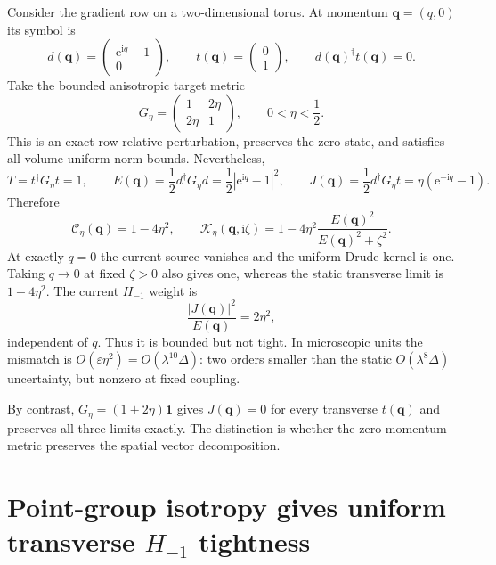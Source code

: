 \documentclass[11pt]{article}
\theoremstyle{definition}
\theoremstyle{remark}
\newcommand{\cK}{\mathcal K}
\newcommand{\cC}{\mathcal C}
\newcommand{\Id}{\mathbf 1}
\newcommand{\I}{\mathrm i}
\newcommand{\e}{\mathrm e}
\newcommand{\abs}[1]{\left\lvert #1\right\rvert}
\newcommand{\eps}{\varepsilon}
\newcommand{\bq}{\bm q}
\begin{document}
Consider the gradient row on a two-dimensional torus.  At momentum
$\bq=(q,0)$ its symbol is
\begin{equation}
 d(\bq)=\begin{pmatrix}\e^{\I q}-1\\0\end{pmatrix},
 \qquad
 t(\bq)=\begin{pmatrix}0\\1\end{pmatrix},
 \qquad d(\bq)^\dagger t(\bq)=0.
 \label{eq:edge-symbol}
\end{equation}
Take the bounded anisotropic target metric
\begin{equation}
 G_\eta=\begin{pmatrix}1&2\eta\\2\eta&1\end{pmatrix},
 \qquad 0<\eta<\frac12.
 \label{eq:anisotropic-G}
\end{equation}
This is an exact row-relative perturbation, preserves the zero state, and
satisfies all volume-uniform norm bounds.  Nevertheless,
\begin{equation}
 T=t^\dagger G_\eta t=1,
 \qquad
 E(\bq)=\frac12d^\dagger G_\eta d=\frac12\abs{\e^{\I q}-1}^2,
 \qquad
 J(\bq)=\frac12d^\dagger G_\eta t=\eta(\e^{-\I q}-1).
 \label{eq:aniso-data}
\end{equation}
Therefore
\begin{equation}
 \cC_\eta(\bq)=1-4\eta^2,
 \qquad
 \cK_\eta(\bq,\I\zeta)
 =1-4\eta^2\frac{E(\bq)^2}{E(\bq)^2+\zeta^2}.
 \label{eq:aniso-kernel}
\end{equation}
At exactly $q=0$ the current source vanishes and the uniform Drude kernel is
one.  Taking $q\to0$ at fixed $\zeta>0$ also gives one, whereas the static
transverse limit is $1-4\eta^2$.  The current $H_{-1}$ weight is
\begin{equation}
 \frac{\abs{J(\bq)}^2}{E(\bq)}=2\eta^2,
 \label{eq:aniso-hminusone}
\end{equation}
independent of $q$.  Thus it is bounded but not tight.  In microscopic units
the mismatch is $O(\eps\eta^2)=O(\lambda^{10}\Delta)$: two orders smaller
than the static $O(\lambda^8\Delta)$ uncertainty, but nonzero at fixed
coupling.

By contrast, $G_\eta=(1+2\eta)\Id$ gives $J(\bq)=0$ for every transverse
$t(\bq)$ and preserves all three limits exactly.  The distinction is whether
the zero-momentum metric preserves the spatial vector decomposition.

\section{Point-group isotropy gives uniform transverse \texorpdfstring{$H_{-1}$}{H-minus-one} tightness}
\label{sec:isotropic-theorem}
\end{document}
